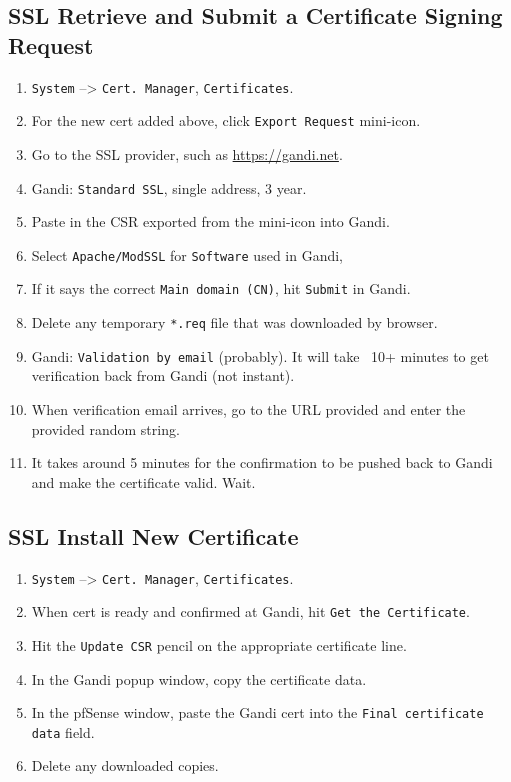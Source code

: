 \subsection{SSL Retrieve and Submit a Certificate Signing Request}
\begin{enumerate}
 \item \texttt{System} --> \texttt{Cert. Manager}, \texttt{Certificates}.
 \item For the new cert added above, click \texttt{Export Request} mini-icon.
 \item Go to the SSL provider, such as \url{https://gandi.net}.
 \item Gandi: \texttt{Standard SSL}, single address, 3 year.
 \item Paste in the CSR exported from the mini-icon into Gandi.
 \item Select \texttt{Apache/ModSSL} for \texttt{Software} used in Gandi, 
 \item If it says the correct \texttt{Main domain (CN)}, hit \texttt{Submit} in Gandi.
 \item Delete any temporary \texttt{*.req} file that was downloaded by browser.
 \item Gandi: \texttt{Validation by email} (probably). It will take ~10+ minutes to get verification back from Gandi (not instant).
 \item When verification email arrives, go to the URL provided and enter the provided random string.
 \item It takes around 5 minutes for the confirmation to be pushed back to Gandi and make the certificate valid. Wait.
\end{enumerate}

\subsection{SSL Install New Certificate}
\begin{enumerate}
 \item \texttt{System} --> \texttt{Cert. Manager}, \texttt{Certificates}.
 \item When cert is ready and confirmed at Gandi, hit \texttt{Get the Certificate}.
 \item Hit the \texttt{Update CSR} pencil on the appropriate certificate line.
 \item In the Gandi popup window, copy the certificate data.
 \item In the pfSense window, paste the Gandi cert into the \texttt{Final certificate data} field.
 \item Delete any downloaded copies.
\end{enumerate}

